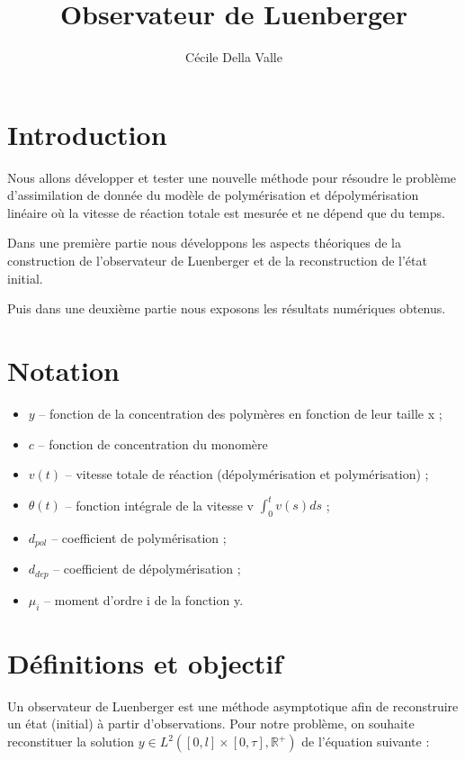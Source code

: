 \documentclass[a4paper]{article}
\title{Observateur de Luenberger}
\author{Cécile Della Valle}
\newcommand{\pol}{d_{pol}}
\newcommand{\dep}{d_{dep}}
\begin{document}
\maketitle

\section{Introduction}

Nous allons développer et tester une nouvelle méthode pour résoudre le problème d'assimilation de donnée 
du modèle de polymérisation et dépolymérisation linéaire où la vitesse de réaction totale est mesurée 
et ne dépend que du temps.

Dans une première partie nous développons les aspects théoriques de la construction de l'observateur de Luenberger
et de la reconstruction de l'état initial.

Puis dans une deuxième partie nous exposons les résultats numériques obtenus.


\section{Notation}

\begin{itemize}
\item $y$ -- fonction de la concentration des polymères en fonction de leur taille x ;
\item $c$ -- fonction de concentration du monomère
\item $v(t)$ -- vitesse totale de réaction (dépolymérisation et polymérisation) ;
\item $\theta(t)$ -- fonction intégrale de la vitesse v $\int_0^t v(s)ds$ ;
\item $\pol$ -- coefficient de polymérisation ;
\item $\dep$ -- coefficient de dépolymérisation ;
\item $\mu_i$ -- moment d'ordre i de la fonction y.
\end{itemize}



\section{Définitions et objectif}

Un observateur de Luenberger est une méthode asymptotique afin de reconstruire un état (initial) à partir d'observations. 
Pour notre problème, on souhaite reconstituer la solution $y \in L^2 ([0,l]\times[0,\tau],\mathbb{R}^+)$ de l'équation suivante :
\end{document}
